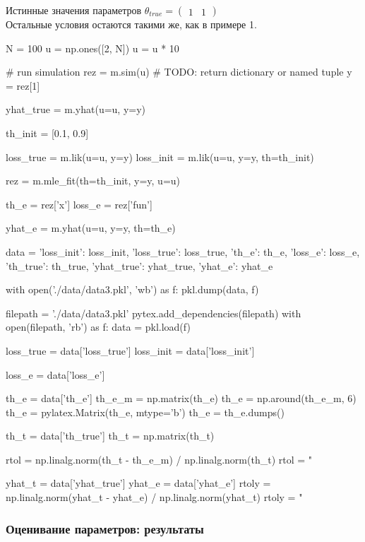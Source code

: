 \documentclass[a4paper,14pt]{extarticle}
\begin{document}
Истинные значения параметров
$\theta_{true} = \begin{pmatrix} 1 & 1 \end{pmatrix}$ \\

Остальные условия остаются такими же, как в примере 1.

\begin{pycode}[model3]
N = 100
u = np.ones([2, N])
u = u * 10

# run simulation
rez = m.sim(u)  # TODO: return dictionary or named tuple
y = rez[1]

yhat_true = m.yhat(u=u, y=y)

th_init = [0.1, 0.9]

loss_true = m.lik(u=u, y=y)
loss_init = m.lik(u=u, y=y, th=th_init)

rez = m.mle_fit(th=th_init, y=y, u=u)

th_e = rez['x']
loss_e = rez['fun']

yhat_e = m.yhat(u=u, y=y, th=th_e)

data = {'loss_init': loss_init,
        'loss_true': loss_true,
        'th_e': th_e,
        'loss_e': loss_e,
        'th_true': th_true,
        'yhat_true': yhat_true,
        'yhat_e': yhat_e}

with open('./data/data3.pkl', 'wb') as f:
    pkl.dump(data, f)
\end{pycode}

\begin{pycode}
filepath = './data/data3.pkl'
pytex.add_dependencies(filepath)
with open(filepath, 'rb') as f:
  data = pkl.load(f)

loss_true = data['loss_true']
loss_init = data['loss_init']

loss_e = data['loss_e']

th_e = data['th_e']
th_e_m = np.matrix(th_e)
th_e = np.around(th_e_m, 6)
th_e = pylatex.Matrix(th_e, mtype='b')
th_e = th_e.dumps()

th_t = data['th_true']
th_t = np.matrix(th_t)

rtol = np.linalg.norm(th_t - th_e_m) / np.linalg.norm(th_t)
rtol = "%

yhat_t = data['yhat_true']
yhat_e = data['yhat_e']
rtoly = np.linalg.norm(yhat_t - yhat_e) / np.linalg.norm(yhat_t)
rtoly = "%
\end{pycode}

\subsubsection{Оценивание параметров: результаты}
\end{document}

